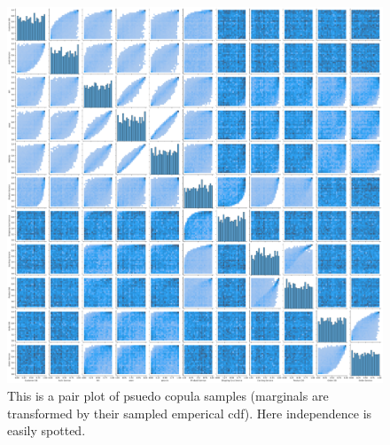 \documentclass[a4paper,12pt]{article}
\begin{document}
\begin{figure}[h]
    \centering
    \includegraphics[width=\textwidth]{../copula example/psuedocopulapairplot.png}
    \caption{
        This is a pair plot of psuedo copula samples (marginals are transformed by their sampled emperical cdf).
        Here independence is easily spotted.
    }
    \label{fig:pair plot psuedo copula}
\end{figure}

\newpage
\printbibliography
\end{document}
